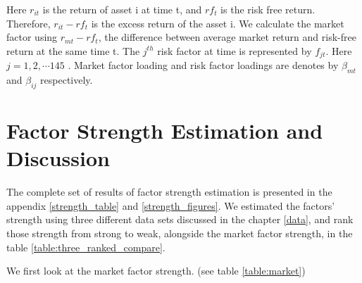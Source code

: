 Here $r_{it}$ is the return of asset i at time t, and $rf_t$ is the risk free return.
Therefore, $r_{it} - rf_t$ is the excess return of the asset i.
We calculate the market factor using $r_{mt} - rf_{t}$, the difference between average market return and risk-free return at the same time t.
The $j^{th}$ risk factor at time is represented by $f_{jt}$.
Here $j = 1, 2, \cdots 145$ . 
Market factor loading and risk factor loadings are denotes by $\beta_{mt}$ and $\beta_{ij}$ respectively.




	\section{Factor Strength Estimation and Discussion}
The complete set of results of factor strength estimation is presented in the appendix \ref{strength_table} and \ref{strength_figures}.
We estimated the factors' strength using three different data sets discussed in the chapter \ref{data}, and rank those strength from strong to weak, alongside the market factor strength, in the table \ref{table:three_ranked_compare}.

We first look at the market factor strength. (see table \ref{table:market})

